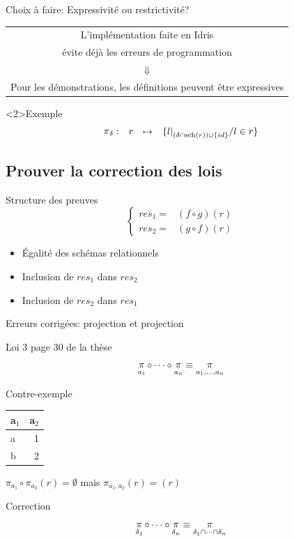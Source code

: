 \documentclass{beamer}
\DeclareMathOperator{\proj}{\mathchar"1119}
\DeclareMathOperator{\s}{sch}
\newcommand{\projDelta}{\proj_{\delta}}
\begin{document}
\begin{frame}{Choix à faire: Expressivité ou restrictivité?}
\begin{center}
\begin{tabular}{c}
L'implémentation faite en Idris \\
évite déjà les erreurs de programmation \\
$\Downarrow$ \\
Pour les démonstrations, les définitions peuvent être expressives
\end{tabular}
\end{center}
\begin{exampleblock}<2>{Exemple}
	$$
	\begin{array}{llcl}
	\projDelta:	& r		& \mapsto		& 
					\{{l|}_{(\delta\cap \s(r)) \cup \{id\}} / l \in r \}
	\end{array}
	$$
\end{exampleblock}
\end{frame}



\subsection{Prouver la correction des lois}
\begin{frame}{Structure des preuves}
$$
\left\lbrace
\begin{array}{cc}
res_1 = & (f \circ g) (r) \\
res_2 = & (g \circ f) (r)
\end{array}
\right.
$$
\begin{itemize}
\item Égalité des schémas relationnels
\item Inclusion de $res_1$ dans $res_2$
\item Inclusion de $res_2$ dans $res_1$
\end{itemize}
\end{frame}

\begin{frame}{Erreurs corrigées: projection et projection}
\begin{block}{Loi 3 page 30 de la thèse}
$$ 
\proj_{a_1} \circ \dots \circ \proj_{a_n} 
\equiv \proj_{a_1, \dots, a_n}
$$
\end{block}
\begin{block}{Contre-exemple}
\begin{tabular}{lr}
		a\(_{\text{1}}\) & a\(_{\text{2}}\)\\
		\hline
		a & 1\\
		b & 2\\
\end{tabular}

\(\pi_{a_1} \circ \pi_{a_2} (r) = \emptyset\)
mais
\(\pi_{a_1, a_2} (r) = (r)\)
\end{block}
\begin{exampleblock}{Correction}
$$
\proj_{\delta_1} \circ \dots \circ \proj_{\delta_n} 
\equiv \proj_{\delta_1 \cap \dots \cap \delta_n}
$$
\end{exampleblock}
\end{frame}
\end{document}
